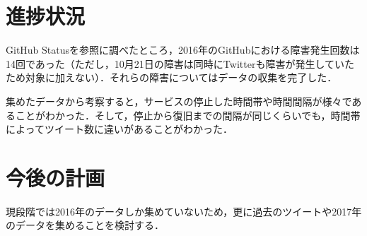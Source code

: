 \documentclass[uplatex,twocolumn,dvipdfmx]{jsarticle}
\begin{document}
\section{進捗状況}
GitHub Statusを参照に調べたところ，2016年のGitHubにおける障害発生回数は14回であった（ただし，10月21日の障害は同時にTwitterも障害が発生していたため対象に加えない）．それらの障害についてはデータの収集を完了した．

集めたデータから考察すると，サービスの停止した時間帯や時間間隔が様々であることがわかった．そして，停止から復旧までの間隔が同じくらいでも，時間帯によってツイート数に違いがあることがわかった．
\section{今後の計画}
現段階では2016年のデータしか集めていないため，更に過去のツイートや2017年のデータを集めることを検討する．

\end{document}
